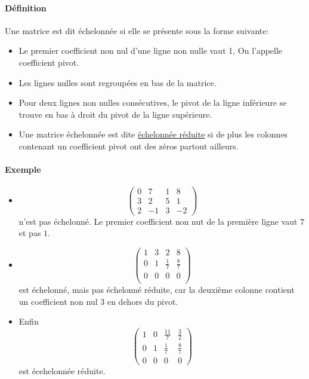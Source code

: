\paragraph{Définition} Une matrice est dit échelonnée si elle se présente sous la forme suivante:
\begin{itemize}
  \item Le premier coefficient non nul d'une ligne non nulle vaut 1, On l'appelle coefficient pivot.
  \item Les lignes nulles sont regroupées en bas de la matrice.
  \item Pour deux lignes non nulles consécutives, le pivot de la ligne inférieure se trouve en bas à droit du pivot de la ligne supérieure.
  \item Une matrice échelonnée est dite \underline{échelonnée réduite} si de plus les colonnes contenant un coefficient pivot ont des zéros partout ailleurs.
\end{itemize}

\paragraph{Exemple}
\begin{itemize}
  \item $$\begin{pmatrix}
      0 & 7 & 1 & 8 \\
      3 & 2 & 5 & 1 \\
      2 & -1 & 3 & -2 
    \end{pmatrix}$$
    n'est pas échelonné. Le premier coefficient non nut de la première ligne vaut $7$ et pas $1$.
    
  \item $$\begin{pmatrix}
      1 & 3 & 2 & 8 \\
      0 & 1 & \frac{1}{7} & \frac{8}{7} \\
      0 & 0 & 0 & 0 \\
    \end{pmatrix}$$
    est échelonné, mais pas échelonné réduite, car la deuxième colonne contient un coefficient non nul $3$ en dehors du pivot.
    
  \item Enfin
    $$\begin{pmatrix}
      1 & 0 & \frac{11}{7} & \frac{3}{2} \\
      0 & 1 & \frac{1}{7} & \frac{8}{7} \\
      0 & 0 & 0 & 0 
    \end{pmatrix}$$
    est écehelonnée réduite.
\end{itemize}

